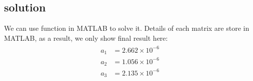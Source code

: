 \documentclass[titlepage,a4paper]{article}
\begin{document}
    \subsection{solution}    
        We can use function in MATLAB to solve it. Details of each matrix are store in MATLAB, as a result, we only show final result here:
        \begin{align}
        \begin{split}
           a_1 &= 2.662\times10^{-6}\\
           a_2 &= 1.056\times10^{-6}\\
           a_3 &= 2.135\times10^{-6}      
        \end{split}
        \end{align}     


\ifx \allfiles \undefined    
\end{document}
